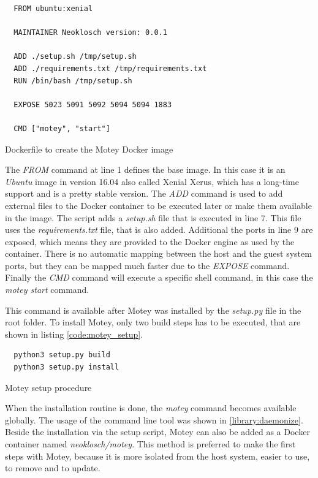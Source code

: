\begin{listing}[H]
  \begin{verbatim}
  FROM ubuntu:xenial

  MAINTAINER Neoklosch version: 0.0.1

  ADD ./setup.sh /tmp/setup.sh
  ADD ./requirements.txt /tmp/requirements.txt
  RUN /bin/bash /tmp/setup.sh

  EXPOSE 5023 5091 5092 5094 5094 1883

  CMD ["motey", "start"]
  \end{verbatim}
  \caption{Dockerfile to create the Motey Docker image}
  \label{code:motey_dockerfile}
\end{listing}

The \textit{FROM} command at line 1 defines the base image.
In this case it is an \textit{Ubuntu} image in version 16.04 also called Xenial Xerus, which has a long-time support and is a pretty stable version.
The \textit{ADD} command is used to add external files to the Docker container to be executed later or make them available in the image.
The script adds a \textit{setup.sh} file that is executed in line 7.
This file uses the \textit{requirements.txt} file, that is also added.
Additional the ports in line 9 are exposed, which means they are provided to the Docker engine as used by the container.
There is no automatic mapping between the host and the guest system ports, but they can be mapped much faster due to the \textit{EXPOSE} command.
Finally the \textit{CMD} command will execute a specific shell command, in this case the \textit{motey start} command.\newline

This command is available after Motey was installed by the \textit{setup.py} file in the root folder.
To install Motey, only two build steps has to be executed, that are shown in listing \ref{code:motey_setup}.\newline

\begin{listing}[H]
  \begin{verbatim}
  python3 setup.py build
  python3 setup.py install
  \end{verbatim}
  \caption{Motey setup procedure}
  \label{code:motey_setup}
\end{listing}

When the installation routine is done, the \textit{motey} command becomes available globally.
The usage of the command line tool was shown in \ref{library:daemonize}.
Beside the installation via the setup script, Motey can also be added as a Docker container named \textit{neoklosch/motey}.
This method is preferred to make the first steps with Motey, because it is more isolated from the host system, easier to use, to remove and to update.

